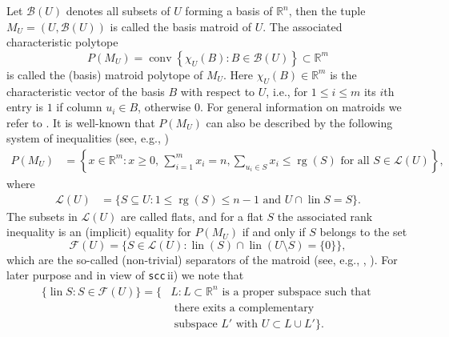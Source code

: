 \documentclass[11pt, a4paper, twoside, reqno]{amsart}
\DeclareMathOperator*{\lin}{lin}
\DeclareMathOperator*{\rg}{rg}
\DeclareMathOperator*{\conv}{conv}
\newcommand{\R}{\mathbb{R}}
\theoremstyle{definition}
\theoremstyle{remark}
\newcommand{\scc}{{\tt scc}}
\numberwithin{equation}{section}
\begin{document}
Let $\mathcal{B}(U)$ denotes all subsets of $U$
forming a basis of $\R^n$, then the tuple $M_U=(U, \mathcal{B}(U))$
is called the basis matroid of $U$. The associated characteristic polytope
\begin{equation*}
P(M_U) =\conv\left\{ \chi_U(B) : B\in \mathcal{B}(U) \right\}\subset\R^m
\end{equation*}
is called the (basis) matroid polytope of $M_U$.  Here $\chi_U(B)\in\R^m$ is the
characteristic vector of the basis $B$ with respect to $U$, i.e., for $1\leq
i\leq m$ its $i$th entry is $1$ if column $u_i\in B$, otherwise $0$.
For general information on matroids we refer to
\cite{GroetschelLovaszSchrijver1993, Aigner1997}. It is
well-known that $P(M_U)$ can also be described by the following system
of inequalities (see, e.g., \cite[Proposition 2.2]{FeichtnerSturmfels2005})
\begin{equation*}
  \begin{split}
    P(M_U) & = \left\{x\in\R^m : x\geq 0,\, \sum_{i=1}^m x_i=n, \sum_{u_i\in S}
    x_i\leq \rg(S) \text{ for all } S\in \mathcal{L}(U)\right\},
    \end{split}
  \end{equation*}
  where
  \begin{equation*}
  \begin{split}
  \mathcal{L}(U) & = \{ S \subseteq U : 1 \leq \rg(S) \leq n - 1
           \text{ and } U \cap \lin S = S \}.
    \end{split}
\end{equation*}
The subsets in $\mathcal{L}(U)$ are called flats, and for a flat $S$
the associated rank inequality is an (implicit) equality
for $P(M_U)$ if and only if $S$ belongs to the set
\begin{equation*}
    \mathcal{F}(U)  = \{ S \in \mathcal{L}(U) : \lin(S) \cap \lin(U \setminus S) = \{ 0 \} \},
  \end{equation*}
which are the so-called (non-trivial)
separators of the matroid
(see, e.g., \cite[pp. 315]{Aigner1997}, \cite{MR270945}).
  For later purpose and in view of \scc \,ii) we note that
  \begin{equation}
    \begin{split}
      \{\lin S :  S \in \mathcal{F}(U) \} = \{ & L : L\subset\R^n
      \text{ is a proper subspace such that } \\[-1ex]
                                   &\text{ there exits a
                                     complementary}\\[-1ex]
                                   &\text{ subspace }L'\text{ with }
                                   U\subset L\cup L' \}.
                                 \end{split}
    \label{eq:second}
  \end{equation}
\end{document}
